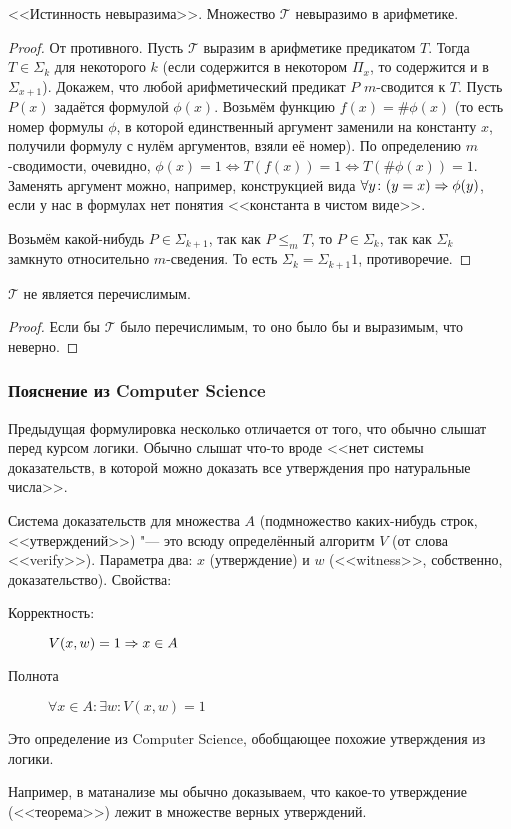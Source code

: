 \begin{theorem}[Тарского]
	<<Истинность невыразима>>.
	Множество $\mathcal{T}$ невыразимо в арифметике.
\end{theorem}
\begin{proof}
	От противного.
	Пусть $\mathcal{T}$ выразим в арифметике предикатом $T$.
	Тогда $T \in \Sigma_k$ для некоторого $k$ (если содержится в некотором $\Pi_{x}$, то содержится и в $\Sigma_{x+1}$).
	Докажем, что любой арифметический предикат $P$ $m$-сводится к $T$.
	Пусть $P(x)$ задаётся формулой $\phi(x)$.
	Возьмём функцию $f(x) = \# \phi(x)$ (то есть номер формулы $\phi$, в которой единственный аргумент заменили
	на константу $x$, получили формулу с нулём аргументов, взяли её номер).
	По определению $m$-сводимости, очевидно, $\phi(x) = 1 \iff T(f(x)) = 1 \iff T(\# \phi(x)) = 1$.
	Заменять аргумент можно, например, конструкцией вида $\forall y \colon (y=x) \Rightarrow \phi(y)$, если
	у нас в формулах нет понятия <<константа в чистом виде>>.
	
	Возьмём какой-нибудь $P \in \Sigma_{k+1}$, так как $P \le_m T$, то $P \in \Sigma_k$, так как
	$\Sigma_k$ замкнуто относительно $m$-сведения.
	То есть $\Sigma_k = \Sigma_{k+1}1$, противоречие.
\end{proof}

\begin{conseq}
	$\mathcal{T}$ не является перечислимым.
\end{conseq}
\begin{proof}
	Если бы $\mathcal{T}$ было перечислимым, то оно было бы и выразимым, что неверно.
\end{proof}

\subsubsection{Пояснение из Computer Science}
Предыдущая формулировка несколько отличается от того, что обычно слышат перед курсом логики.
Обычно слышат что-то вроде <<нет системы доказательств, в которой можно доказать все утверждения
про натуральные числа>>.
\begin{Def}
	Система доказательств для множества $A$ (подмножество каких-нибудь строк, <<утверждений>>) "--- это всюду определённый алгоритм $V$ (от слова <<verify>>).
	Параметра два: $x$ (утверждение) и $w$ (<<witness>>, собственно, доказательство).
	Свойства:
	\begin{description}
	\item[Корректность:]
		$V(x, w) = 1 \Rightarrow x \in A$
	\item[Полнота]
		$\forall x \in A \colon \exists w \colon V(x, w) = 1$
	\end{description}
\end{Def}
\begin{Rem}
	Это определение из Computer Science, обобщающее похожие утверждения из логики.
\end{Rem}
\begin{Rem}
	Например, в матанализе мы обычно доказываем, что какое-то утверждение (<<теорема>>) лежит в множестве
	верных утверждений.
\end{Rem}

